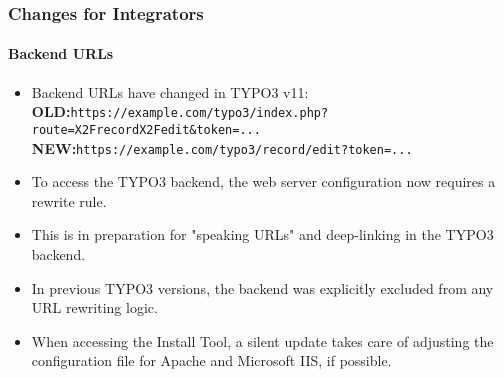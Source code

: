 %

\begin{frame}[fragile]
	\frametitle{Changes for Integrators}
	\framesubtitle{Backend URLs}

	\begin{itemize}
		\item Backend URLs have changed in TYPO3 v11:\newline
			\small
				\textbf{OLD:}\tabto{1.4cm}\texttt{https://example.com/typo3/index.php?route=X2FrecordX2Fedit\&token=...}\newline
				\textbf{NEW:}\tabto{1.4cm}\texttt{https://example.com/typo3/record/edit?token=...}
			\normalsize

		\item To access the TYPO3 backend, the web server configuration now
			requires a rewrite rule.
		\item This is in preparation for "speaking URLs" and deep-linking in the
			TYPO3 backend.
		\item In previous TYPO3 versions, the backend was explicitly excluded
			from any URL rewriting logic.
		\item When accessing the Install Tool, a silent update takes care of
			adjusting the configuration file for Apache and Microsoft IIS,
			if possible.

	\end{itemize}
\end{frame}

